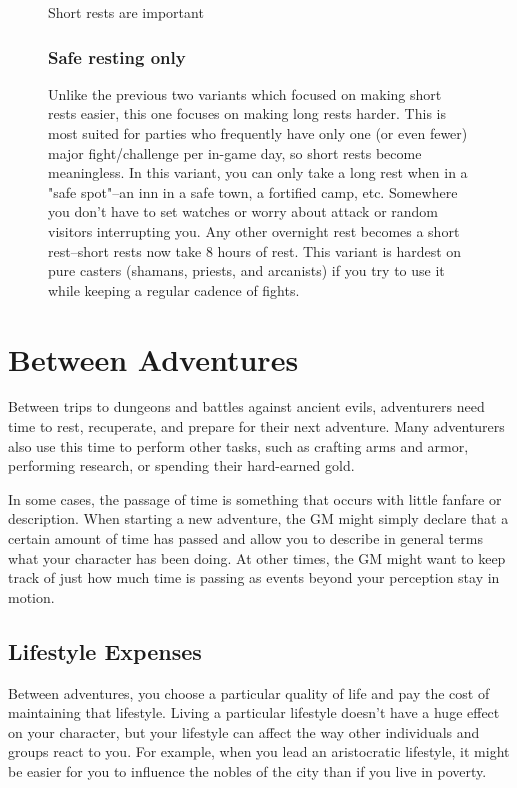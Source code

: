 \begin{figure}
\begin{DndSidebar}{Short rests are important}
        \subsubsection{Safe resting only}
        Unlike the previous two variants which focused on making short rests easier, this one focuses on making long rests harder. This is most suited for parties who frequently have only one (or even fewer) major fight/challenge per in-game day, so short rests become meaningless. In this variant, you can only take a long rest when in a "safe spot"--an inn in a safe town, a fortified camp, etc. Somewhere you don't have to set watches or worry about attack or random visitors interrupting you. Any other overnight rest becomes a short rest--short rests now take 8 hours of rest. This variant is hardest on pure casters (shamans, priests, and arcanists) if you try to use it while keeping a regular cadence of fights.
    \end{DndSidebar}
\end{figure}


\section{Between Adventures}

Between trips to dungeons and battles against ancient evils, adventurers need time to rest, recuperate, and prepare for their next adventure. Many adventurers also use this time to perform other tasks, such as crafting arms and armor, performing research, or spending their hard-earned gold.

In some cases, the passage of time is something that occurs with little fanfare or description. When starting a new adventure, the GM might simply declare that a certain amount of time has passed and allow you to describe in general terms what your character has been doing. At other times, the GM might want to keep track of just how much time is passing as events beyond your perception stay in motion.

\subsection{Lifestyle Expenses}

Between adventures, you choose a particular quality of life and pay the cost of maintaining that lifestyle. Living a particular lifestyle doesn't have a huge effect on your character, but your lifestyle can affect the way other individuals and groups react to you. For example, when you lead an aristocratic lifestyle, it might be easier for you to influence the nobles of the city than if you live in poverty.

